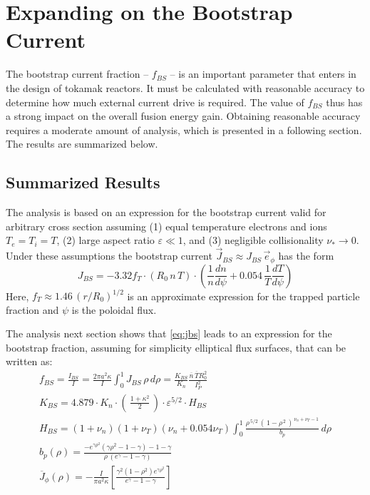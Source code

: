 \chapter{Expanding on the Bootstrap Current}

\label{chapter:bootstrap}

The bootstrap current fraction -- $f_{BS}$ -- is an important parameter that enters in the design of tokamak reactors. It must be calculated with reasonable accuracy to determine how much external current drive is required. The value of $f_{BS}$ thus has a strong impact on the overall fusion energy gain. Obtaining reasonable accuracy requires a moderate amount of analysis, which is presented in a following section. The results are summarized below.

\section{Summarized Results}

The analysis is based on an expression for the bootstrap current valid for arbitrary cross section assuming (1) equal temperature electrons and ions $T_e = T_i = T$, (2) large aspect ratio $\varepsilon \ll 1$, and (3) negligible collisionality $\nu_* \rightarrow 0$. Under these assumptions the bootstrap current $\vec J_{BS} \approx J_{BS} \, \vec e_\phi$ has the form
\begin{equation}
	\label{eq:jbs}
	J_{BS} = -3.32 f_T \cdot \left( R_0 \, n \, T \right) \cdot  \left( \frac{1}{n} \frac{dn}{d\psi} + 0.054 \, \frac{1}{T} \frac{dT}{d\psi} \right)
\end{equation}
Here, $f_T \approx 1.46 \, ( r / R_0 )^{1/2}$ is an approximate expression for the trapped particle fraction and $\psi$ is the poloidal flux.

The analysis next section shows that \cref{eq:jbs} leads to an expression for the bootstrap fraction, assuming for simplicity elliptical flux surfaces, that can be written as:  ~
\begin{gather}
	f_{BS} = \frac{I_{BS}}{I} = \frac{ 2 \pi a^2 \kappa }{I} \int_0^1 J_{BS} \, \rho \, d\rho = \frac{ K_{BS} }{ K_n } \frac{\overline n \, \overline T R_0^2}{I_P^2} \\
  K_{BS} = 4.879 \cdot  K_n \cdot \left( \, \frac{1+\kappa^2}{2} \, \right) \cdot \varepsilon^{5/2} \cdot H_{BS} \\
  H_{BS} = ( 1 + \nu_n ) ( 1 + \nu_T ) ( \nu_n + 0.054 \nu_T ) \int_0^1 \frac{ \rho^{\,5/2} \, ( \, 1 - \rho^{\,2} \, )^{\, \nu_n + \nu_T - 1} }{b_p} \, d\rho \\
	b_p(\rho) = \frac{ -e^{\gamma\rho^2} ( \gamma\rho^2 - 1 - \gamma ) - 1 - \gamma }{\rho \,( e^\gamma - 1 - \gamma ) } \\
	\overline J_\phi (\rho ) = - \frac{ I }{ \pi a^2 \kappa } \left[ \frac{\gamma^2 ( 1 - \rho ^2 ) e^{\gamma \rho^2}}{e^\gamma - 1 - \gamma} \right]
\end{gather}

